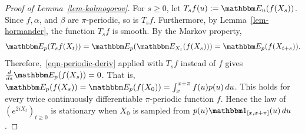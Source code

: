 \documentclass[11pt]{article}
\theoremstyle{plain}
\theoremstyle{definition}
\numberwithin{equation}{section}
\newcommand{\eqbn}{\begin{equation*}}
\newcommand{\eqen}{\end{equation*}}
\newcommand{\BB}{\mathbbm}
\let\originalleft\left
\let\originalright\right
\renewcommand{\left}{\mathopen{}\mathclose\bgroup\originalleft}
\renewcommand{\right}{\aftergroup\egroup\originalright}
\begin{document}
\begin{proof}[Proof of Lemma~\ref{lem-kolmogorov}]
For $s \geq 0$, let $T_s f (u) := \BB E_u(f(X_s))$. Since $f,\alpha$, and $\beta$ are $\pi$-periodic, so is $T_s f$. Furthermore, by Lemma~\ref{lem-hormander}, the function $T_s f$ is smooth. %
By the Markov property, 
\eqbn
\BB E_p\left( T_s f(X_t) \right)  = \BB E_p\left( \BB E_{X_t}(f(X_s) ) \right) = \BB E_p (f(X_{t+s}) ) .
\eqen
Therefore,~\eqref{eqn-periodic-deriv} applied with $T_s f$ instead of $f$ gives $\frac{d}{ds} \BB E_p(f(X_s)) = 0$. That is, $\BB E_p(f(X_s)) = \BB E_p(f(X_0)) = \int_x^{x+\pi} f(u) p(u) \,du$. This holds for every twice continuously differentiable $\pi$-periodic function $f$. Hence the law of $(e^{2 iX_t})_{t\geq 0}$ is stationary when $X_0$ is sampled from $  p(u) \BB 1_{[x,x+\pi]}(u)\,du$. 
\end{proof}



 

%

\end{document}
